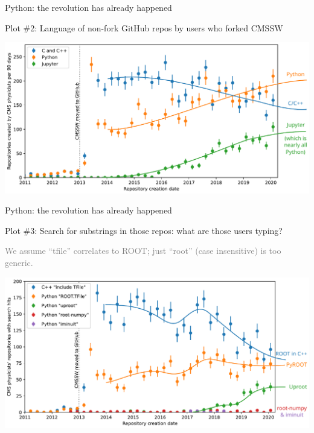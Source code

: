 \documentclass[aspectratio=169]{beamer}
\begin{document}
\begin{frame}{Python: the revolution has already happened}
\large
\vspace{0.35 cm}

Plot \#2: Language of non-fork GitHub repos by users who forked CMSSW

\normalsize
\vspace{\baselineskip}

\begin{center}
\includegraphics[width=0.85\linewidth]{img/01-github-cmssw-language.pdf}
\end{center}
\end{frame}

\begin{frame}{Python: the revolution has already happened}
\large
\vspace{0.35 cm}

Plot \#3: Search for substrings in those repos: what are those users typing?

\normalsize
\textcolor{gray}{We assume ``tfile'' correlates to ROOT; just ``root'' (case insensitive) is too generic.}

\begin{center}
\includegraphics[width=0.85\linewidth]{img/03-github-root-python.pdf}
\end{center}
\end{frame}
\end{document}

